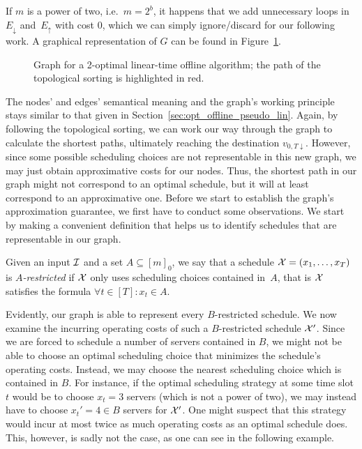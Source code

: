 If $m$ is a power of two, i.e.\ $m=2^b$, it happens that we add unnecessary loops in~$E_\downarrow$ and~$E_\uparrow$ with cost $0$, which we can simply ignore/discard for our following work.
A graphical representation of $G$ can be found in Figure~\ref{fig:graph_lin_approx_2}.
\begin{figure}[ht]

\caption{Graph for a 2-optimal linear-time offline algorithm; the path of the topological sorting is highlighted in red.}
\label{fig:graph_lin_approx_2}
\end{figure}
The nodes' and edges' semantical meaning and the graph's working principle stays similar to that given in Section~\ref{sec:opt_offline_pseudo_lin}. Again, by following the topological sorting, we can work our way through the graph to calculate the shortest paths, ultimately reaching the destination $v_{0,T\downarrow}$. However, since some possible scheduling choices are not representable in this new graph, we may just obtain approximative costs for our nodes. Thus, the shortest path in our graph might not correspond to an optimal schedule, but it will at least correspond to an approximative one. Before we start to establish the graph's approximation guarantee, we first have to conduct some observations. We start by making a convenient definition that helps us to identify schedules that are representable in our graph.
\begin{defn}
Given an input $\mathcal{I}$ and a set $A\subseteq[m]_0$, we say that a schedule $\mathcal{X}=(x_1,\dotsc,x_T)$ is \emph{$A$-restricted} if $\mathcal{X}$ only uses scheduling choices contained in~$A$, that is $\mathcal{X}$ satisfies the formula $\forall t\in[T]:x_t\in A$.
\end{defn}
Evidently, our graph is able to represent every $B$-restricted schedule. We now examine the incurring operating costs of such a $B$-restricted schedule $\mathcal{X}'$. Since we are forced to schedule a number of servers contained in $B$, we might not be able to choose an optimal scheduling choice that minimizes the schedule's operating costs. Instead, we may choose the nearest scheduling choice which is contained in $B$. For instance, if the optimal scheduling strategy at some time slot $t$ would be to choose $x_t=3$ servers (which is not a power of two), we may instead have to choose $x_t'=4\in B$ servers for $\mathcal{X}'$. One might suspect that this strategy would incur at most twice as much operating costs as an optimal schedule does. This, however, is sadly not the case, as one can see in the following example.
